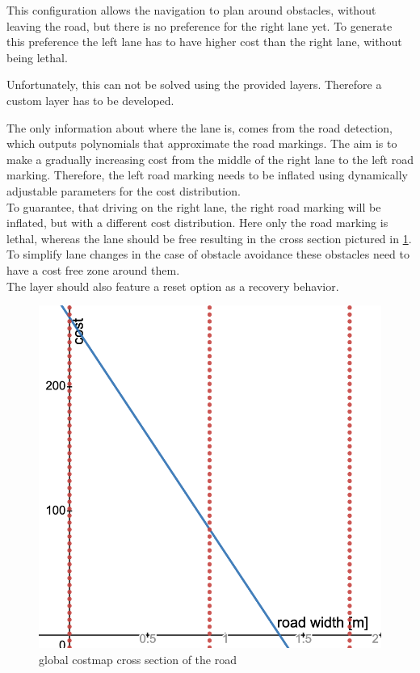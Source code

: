 This configuration allows the navigation to plan around obstacles, without leaving the road, but there is no preference for the right lane yet. To generate this preference the left lane has to have higher cost than the right lane, without being lethal.

Unfortunately, this can not be solved using the provided layers. Therefore a custom layer has to be developed.

The only information about where the lane is, comes from the road detection, which outputs polynomials that approximate the road markings. The aim is to make a gradually increasing cost from the middle of the right lane to the left road marking. Therefore, the left road marking needs to be inflated using dynamically adjustable parameters for the cost distribution.\\


To guarantee, that driving on the right lane, the right road marking will be inflated, but with a different cost distribution. Here only the road marking is lethal, whereas the lane should be free resulting in the cross section pictured in \ref{globalcostdistro}. To simplify lane changes in the case of obstacle avoidance these obstacles need to have a cost free zone around them.\\

The layer should also feature a reset option as a recovery behavior.

\begin{figure}[H]
	\centering
	\includegraphics[width=.8\textwidth]{Pictures/global stage cost distro}
	\caption{global costmap cross section of the road}
	\label{globalcostdistro}
\end{figure}



